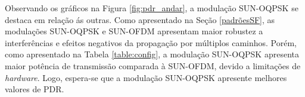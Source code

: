 
Observando os gráficos na Figura \ref{fig:pdr_andar}, a modulação SUN-OQPSK se destaca em relação ás outras. Como apresentado na Seção \ref{padrõesSF}, as modulações SUN-OQPSK e SUN-OFDM apresentam maior robustez a interferências e efeitos negativos da propagação por múltiplos caminhos. Porém, como apresentado na Tabela \ref{table:config}, a modulação SUN-OQPSK apresenta maior potência de transmissão comparada à SUN-OFDM, devido a limitações de \emph{hardware}. Logo, espera-se que a modulação SUN-OQPSK apresente melhores valores de PDR.


